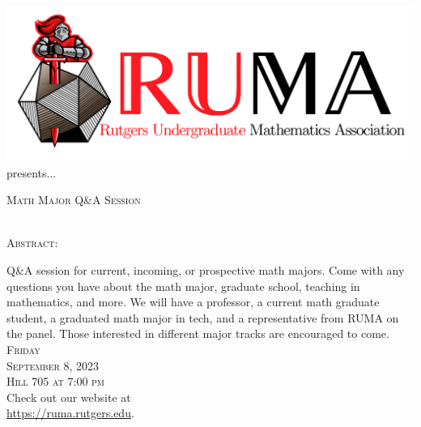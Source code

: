 \documentclass[12pt]{article}
\begin{document}

\begin{center}\includegraphics[scale=.4]{RUMAlogo.png}\\
\large  presents... \\

\vspace{2mm}
\begin{spacing}{1}
{\fontsize{35}{44}\selectfont  \textsc{
Math Major Q\&A Session}} \end{spacing}
 

 ~~\\

\normalsize
\textsc{Abstract:}

\Large 
Q\&A session for current, incoming, or prospective math
majors. Come with any questions you have about the math
major, graduate school, teaching in mathematics, and more. We will
have a professor, a current math graduate student, a graduated math major in tech, and a representative from RUMA on the
panel. Those interested in different major tracks are encouraged
to come. \\

\vspace{2.5mm} 
\huge   \textsc{Friday\\September 8, 2023 \\Hill 705 at 7:00 pm} \\
\vspace{2.5mm}
\Large  Check out our website at \\
\url{https://ruma.rutgers.edu}.
\end{center}
\end{document}

